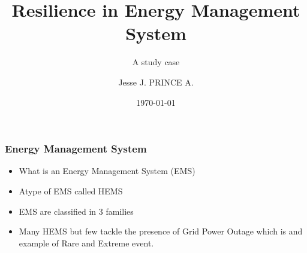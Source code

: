 \documentclass{beamer}
\title{Resilience in Energy Management System}
\subtitle{A study case}
\author{Jesse J.\textsc{ PRINCE A.}}
\institute{IETR/CentraleSupelec}
\date{\today}
\begin{document}
\begin{frame}
\titlepage
\end{frame}


\begin{frame}
\frametitle{Energy Management System}
\begin{itemize}
    \item What is an Energy Management System (EMS)  \vspace{10px}
    \item Atype of EMS called HEMS \vspace{10px}
    \item EMS are classified in 3 families
    \item Many HEMS but few  tackle the presence of Grid Power Outage which is and example of Rare and Extreme event.
\end{itemize}
     
\end{frame}
\end{document}
